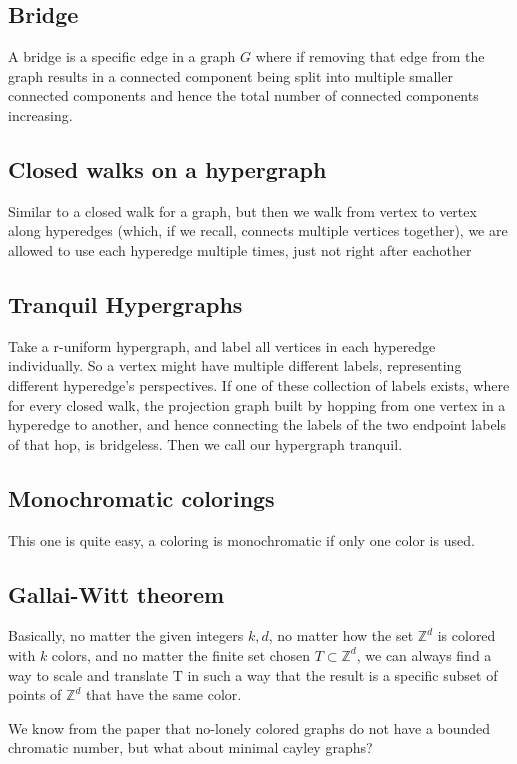 \documentclass[a4paper,10pt]{article}
\numberwithin{equation}{section}
\theoremstyle{definition}
\begin{document}
    \subsection{Bridge}
        A bridge is a specific edge in a graph \(G\) where if removing that edge from the graph results in a connected component being split into multiple smaller connected components and hence the total number of connected components increasing.
    \subsection{Closed walks on a hypergraph}
        Similar to a closed walk for a graph, but then we walk from vertex to vertex along hyperedges (which, if we recall, connects multiple vertices together), we are allowed to use each hyperedge multiple times, just not right after eachother
    \subsection{Tranquil Hypergraphs}
        Take a r-uniform hypergraph, and label all vertices in each hyperedge individually. So a vertex might have multiple different labels, representing different hyperedge's perspectives.
        If one of these collection of labels exists, where for every closed walk, the projection graph built by hopping from one vertex in a hyperedge to another, and hence connecting the labels of the two endpoint labels of that hop, is bridgeless.
        Then we call our hypergraph tranquil.
    \subsection{Monochromatic colorings}
        This one is quite easy, a coloring is monochromatic if only one color is used.
    \subsection{Gallai-Witt theorem}
        Basically, no matter the given integers \(k,d\), no matter how the set \(\mathbb{Z}^d\) is colored with \(k\) colors, and no matter the finite set chosen \(T\subset\mathbb{Z}^d\), 
        we can always find a way to scale and translate T in such a way that the result is a specific subset of points of \(\mathbb{Z}^d\) that have the same color.

    We know from the paper that no-lonely colored graphs do not have a bounded chromatic number, but what about minimal cayley graphs?
\end{document}
